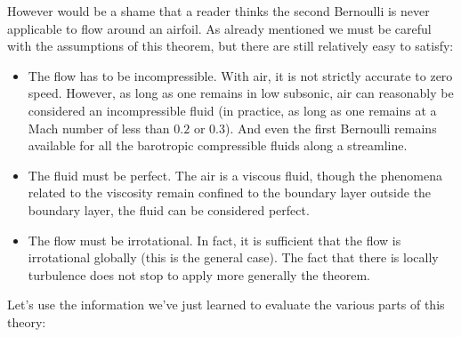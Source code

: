 	However would be a shame that a reader thinks the second Bernoulli is never applicable to flow around an airfoil. As already mentioned we must be careful with the assumptions of this theorem, but there are still relatively easy to satisfy:
	\begin{itemize}
		\item The flow has to be incompressible. With air, it is not strictly accurate to zero speed. However, as long as one remains in low subsonic, air can reasonably be considered an incompressible fluid (in practice, as long as one remains at a Mach number of less than $0.2$ or $0.3$). And even the first Bernoulli remains available for all the barotropic compressible fluids along a streamline.
		
		\item The fluid must be perfect. The air is a viscous fluid, though the phenomena related to the viscosity remain confined to the boundary layer outside the boundary layer, the fluid can be considered perfect.
		
		\item The flow must be irrotational. In fact, it is sufficient that the flow is irrotational globally (this is the general case). The fact that there is locally turbulence does not stop to apply more generally the theorem.
	\end{itemize}
	Let's use the information we've just learned to evaluate the various parts of this theory:

